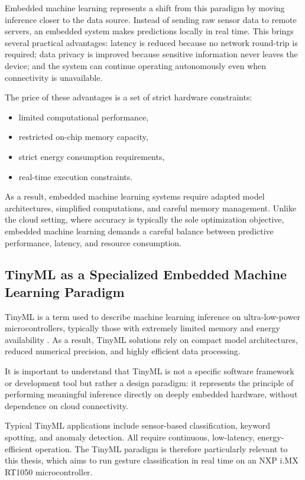 Embedded machine learning represents a shift from this paradigm by moving inference closer to the data source. Instead of sending raw sensor data to remote servers, an embedded system makes predictions locally in real time. This brings several practical advantages: latency is reduced because no network round-trip is required; data privacy is improved because sensitive information never leaves the device; and the system can continue operating autonomously even when connectivity is unavailable.

The price of these advantages is a set of strict hardware constraints:
\begin{itemize}
    \item limited computational performance,
    \item restricted on-chip memory capacity,
    \item strict energy consumption requirements,
    \item real-time execution constraints.
\end{itemize}

As a result, embedded machine learning systems require adapted model architectures, simplified computations, and careful memory management. Unlike the cloud setting, where accuracy is typically the sole optimization objective, embedded machine learning demands a careful balance between predictive performance, latency, and resource consumption.

\subsection{TinyML as a Specialized Embedded Machine Learning Paradigm}

TinyML is a term used to describe machine learning inference on ultra-low-power microcontrollers, typically those with extremely limited memory and energy availability \cite{warden2019tinyml}. As a result, TinyML solutions rely on compact model architectures, reduced numerical precision, and highly efficient data processing.

It is important to understand that TinyML is not a specific software framework or development tool but rather a design paradigm: it represents the principle of performing meaningful inference directly on deeply embedded hardware, without dependence on cloud connectivity. 

Typical TinyML applications include sensor-based classification, keyword spotting, and anomaly detection. All require continuous, low-latency, energy-efficient operation. The TinyML paradigm is therefore particularly relevant to this thesis, which aims to run gesture classification in real time on an NXP i.MX RT1050 microcontroller.


